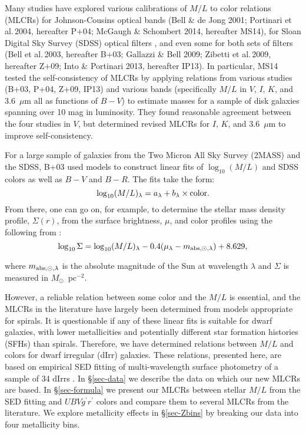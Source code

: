 \documentclass[12pt]{emulateapj}
\begin{document}
Many studies have explored various calibrations of $M/L$ to color relations (MLCRs) for Johnson-Cousins optical bands (Bell \& de Jong 2001; Portinari et al.\,2004, hereafter P+04; McGaugh \& Schombert 2014, hereafter MS14), for Sloan Digital Sky Survey (SDSS) optical filters \citep{t+11,rc15}, and even some for both sets of filters (Bell et al.\,2003, hereafter B+03; Gallazzi \& Bell 2009; Zibetti et al.\,2009, hereafter Z+09; Into \& Portinari 2013, hereafter IP13).  In particular, MS14 tested the self-consistency of MLCRs by applying relations from various studies (B+03, P+04, Z+09, IP13) and various bands (specifically $M/L$ in $V$, $I$, $K$, and 3.6~$\mu$m all as functions of $B-V$) to estimate masses for a sample of disk galaxies spanning over 10 mag in luminosity. They found reasonable agreement between the four studies in $V$, but determined revised MLCRs for $I$, $K$, and 3.6~$\mu$m to improve self-consistency.

For a large sample of galaxies from the Two Micron All Sky Survey (2MASS) and the SDSS, B+03 used models to construct linear fits of $\log_{10} (M/L)$ and SDSS colors as well as $B-V$ and $B-R$. The fits take the form:
\begin{equation}
\log_{10} (M/L)_{\lambda} = a_{\lambda} + b_{\lambda} \times \rm{color}.
\end{equation}
From there, one can go on, for example, to determine the stellar mass density profile, $\Sigma (r)$, from the surface brightness, $\mu$, and color profiles using the following from \citet{btp08}:
\begin{equation}
\log_{10} \Sigma = \log_{10} (M/L)_{\lambda} - 0.4(\mu_{\lambda}-m_{\rm{abs},\odot,\lambda}) + 8.629,
\end{equation}

\noindent where $m_{\rm{abs},\odot,\lambda}$ is the absolute magnitude of the Sun at wavelength $\lambda$ and $\Sigma$ is measured in $M_{\odot}$~pc$^{-2}$.

However, a reliable relation between some color and the $M/L$ is essential, and the MLCRs in the literature have largely been determined from models appropriate for spirals. It is questionable if any of these linear fits is suitable for dwarf galaxies, with lower metallicities and potentially different star formation histories (SFHs) than spirals. Therefore, we have determined relations between $M/L$ and colors for dwarf irregular (dIrr) galaxies. These relations, presented here, are based on empirical SED fitting of multi-wavelength surface photometry of a sample of 34 dIrrs \citep{z+12}. In \S \ref{sec-data} we describe the data on which our new MLCRs are based. In \S \ref{sec-formula} we present our MLCRs between stellar $M/L$ from the SED fitting and $UBVg^\prime r^\prime$ colors and compare them to several MLCRs from the literature.  We explore metallicity effects in \S \ref{sec-Zbins} by breaking our data into four metallicity bins.
\end{document}
